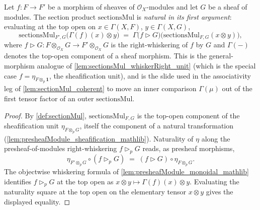 \begin{lemma}\leanok
  \label{lem:sectionsMul_whiskerRight_natural}
  Let \(f : F \to F'\) be a morphism of sheaves of \(\mathcal{O}_X\)-modules and let
  \(G\) be a sheaf of modules. The section product \(\mathrm{sectionsMul}\) is
  \emph{natural in its first argument}: evaluating at the top open on
  \(x \in \Gamma(X,F)\), \(y \in \Gamma(X,G)\),
  \[
    \mathrm{sectionsMul}_{F',G}\bigl(\Gamma(f)(x) \otimes y\bigr)
      \;=\;
    \Gamma\bigl(f \rhd G\bigr)\bigl(\mathrm{sectionsMul}_{F,G}(x \otimes y)\bigr),
  \]
  where \(f \rhd G : F \otimes_{\mathcal{O}_X} G \to F' \otimes_{\mathcal{O}_X} G\) is
  the right-whiskering of \(f\) by \(G\) and \(\Gamma(-)\) denotes the top-open
  component of a sheaf morphism. This is the general-morphism analogue of
  \cref{lem:sectionsMul_whiskerRight_unit} (which is the special case
  \(f = \eta_{F \otimes_p \mathbf{1}}\), the sheafification unit), and is the slide
  used in the associativity leg of \cref{lem:sectionMul_coherent} to move an inner
  comparison \(\Gamma(\mu)\) out of the first tensor factor of an outer
  \(\mathrm{sectionsMul}\).
\end{lemma}

\begin{proof}
  \leanok

  By \cref{def:sectionMul}, \(\mathrm{sectionsMul}_{F,G}\) is the top-open component of
  the sheafification unit \(\eta_{F \otimes_{p} G}\), itself the component of a natural
  transformation (\cref{lem:presheafModule_sheafification_mathlib}). Naturality of
  \(\eta\) along the presheaf-of-modules right-whiskering \(f \rhd_p G\) reads, as
  presheaf morphisms,
  \[
    \eta_{F' \otimes_p G} \circ (f \rhd_p G)
      \;=\;
    (f \rhd G) \circ \eta_{F \otimes_p G}.
  \]
  The objectwise whiskering formula of \cref{lem:presheafModule_monoidal_mathlib}
  identifies \(f \rhd_p G\) at the top open as
  \(x \otimes y \mapsto \Gamma(f)(x) \otimes y\). Evaluating the naturality square at
  the top open on the elementary tensor \(x \otimes y\) gives the displayed equality.
\end{proof}

